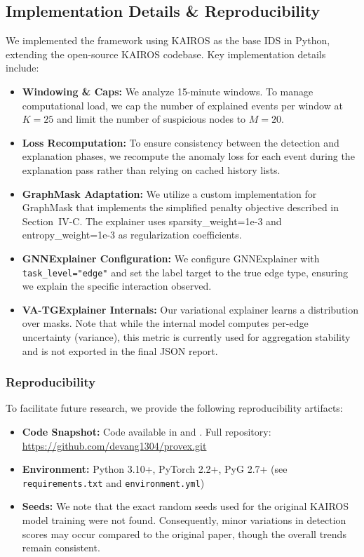 \documentclass[conference]{IEEEtran}
\begin{document}
\subsection{Implementation Details \& Reproducibility}
We implemented the framework using KAIROS as the base IDS in Python, extending the open-source KAIROS codebase. Key implementation details include:
\begin{itemize}
    \item \textbf{Windowing \& Caps:} We analyze 15-minute windows. To manage computational load, we cap the number of explained events per window at $K=25$ and limit the number of suspicious nodes to $M=20$.
    \item \textbf{Loss Recomputation:} To ensure consistency between the detection and explanation phases, we recompute the anomaly loss for each event during the explanation pass rather than relying on cached history lists.
    \item \textbf{GraphMask Adaptation:} We utilize a custom implementation for GraphMask that implements the simplified penalty objective described in Section~IV-C. The explainer uses \mbox{sparsity\_weight=1e-3} and \mbox{entropy\_weight=1e-3} as regularization coefficients.
    \item \textbf{GNNExplainer Configuration:} We configure GNNExplainer with \texttt{task\_level="edge"} and set the label target to the true edge type, ensuring we explain the specific interaction observed.
    \item \textbf{VA-TGExplainer Internals:} Our variational explainer learns a distribution over masks. Note that while the internal model computes per-edge uncertainty (variance), this metric is currently used for aggregation stability and is not exported in the final JSON report.
\end{itemize}

\subsubsection{Reproducibility}
To facilitate future research, we provide the following reproducibility artifacts:
\begin{itemize}
    \item \textbf{Code Snapshot:} Code available in  and . Full repository: \url{https://github.com/devang1304/provex.git}
    \item \textbf{Environment:} Python 3.10+, PyTorch 2.2+, PyG 2.7+ (see \texttt{requirements.txt} and \texttt{environment.yml})
    \item \textbf{Seeds:} We note that the exact random seeds used for the original KAIROS model training were not found. Consequently, minor variations in detection scores may occur compared to the original paper, though the overall trends remain consistent.
\end{itemize}
\end{document}
